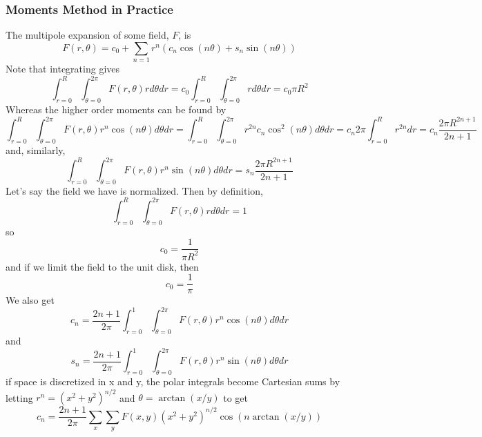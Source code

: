 \documentclass[twoside]{article}
\begin{document}
\subsubsection{Moments Method in Practice}
The multipole expansion of some field, $F$, is
\begin{equation}
F(r,\theta) =   c_0 +  \sum_{n=1} r^{n} (c_{n} \cos(n \theta)  + s_{n} \sin(n \theta )   )
\end{equation}
Note that integrating gives
\begin{equation}
\int^{R}_{r = 0} \int^{2\pi}_{\theta = 0} F(r,\theta) r d\theta dr =    
c_0 \int^{R}_{r = 0} \int^{2\pi}_{\theta = 0}  r d\theta dr = 
c_0 \pi R^2
\end{equation}
Whereas the higher order moments can be found by
\begin{equation}
\int^{R}_{r = 0}  \int^{2\pi}_{\theta = 0} F(r,\theta) r^n \cos(n\theta) d\theta dr=   
\int^{R}_{r = 0}  \int^{2\pi}_{\theta = 0} r^{2n}  c_n \cos^2(n\theta) d\theta dr =   
c_n  2 \pi \int^{R}_{r = 0}   r^{2n}   dr =  
c_n \frac{  2 \pi R^{2n+1}}{2n + 1} 
\end{equation}
and, similarly, 
\begin{equation}
\int^{R}_{r = 0}  \int^{2\pi}_{\theta = 0} F(r,\theta) r^n \sin(n\theta) d\theta dr=   
s_n \frac{  2 \pi R^{2n+1}}{2n + 1} 
\end{equation}
Let's say the field we have is normalized. Then by definition, 
\begin{equation}
\int^{R}_{r = 0} \int^{2\pi}_{\theta = 0} F(r,\theta) r d\theta dr =    
1
\end{equation}
so
\begin{equation}
c_0 = \frac{1}{\pi R^2}
\end{equation}
and if we limit the field to the unit disk, then
\begin{equation}
c_0 = \frac{1}{\pi}
\end{equation}
We also get
\begin{equation}
c_n = \frac{2n+1}{2\pi} \int^{1}_{r = 0}  \int^{2\pi}_{\theta = 0} F(r,\theta) r^n \cos(n\theta) d\theta dr
\end{equation}
and
\begin{equation}
s_n = \frac{2n+1}{2\pi} \int^{1}_{r = 0}  \int^{2\pi}_{\theta = 0} F(r,\theta) r^n \sin(n\theta) d\theta dr 
\end{equation}
if space is discretized in x and y, the polar integrals become Cartesian sums by letting $r^n=(x^2 + y^2)^{n/2}$ and  $\theta = \arctan(x/y)$ to get
\begin{equation}
c_n = \frac{2n+1}{2\pi} \sum_{x}  \sum_{y} 
F(x,y) (x^2 + y^2)^{n/2} \cos(n \arctan(x/y))
\end{equation}
\end{document}
